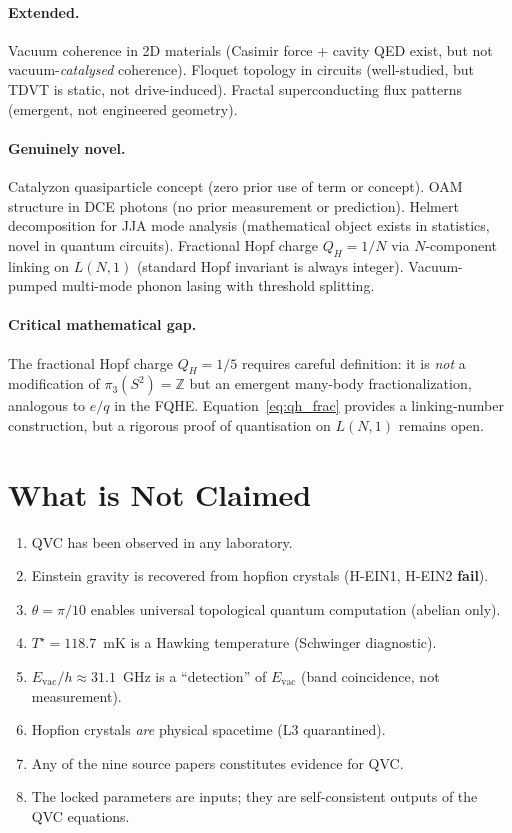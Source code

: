 \documentclass[11pt,letterpaper]{article}
\newcommand{\Evac}{E_{\mathrm{vac}}}
\newcommand{\Qhopf}{Q_H}
\newcommand{\Tstar}{T^{\!\star}}
\begin{document}
\paragraph{Extended.}  Vacuum coherence in 2D materials (Casimir force + cavity QED exist, but not vacuum-\emph{catalysed} coherence).  Floquet topology in circuits (well-studied, but TDVT is static, not drive-induced).  Fractal superconducting flux patterns (emergent, not engineered geometry).

\paragraph{Genuinely novel.}  Catalyzon quasiparticle concept (zero prior use of term or concept).  OAM structure in DCE photons (no prior measurement or prediction).  Helmert decomposition for JJA mode analysis (mathematical object exists in statistics, novel in quantum circuits).  Fractional Hopf charge $\Qhopf = 1/N$ via $N$-component linking on $L(N,1)$ (standard Hopf invariant is always integer).  Vacuum-pumped multi-mode phonon lasing with threshold splitting.

\paragraph{Critical mathematical gap.}  The fractional Hopf charge $\Qhopf = 1/5$ requires careful definition: it is \emph{not} a modification of $\pi_3(S^2) = \mathbb{Z}$ but an emergent many-body fractionalization, analogous to $e/q$ in the FQHE.  Equation~\ref{eq:qh_frac} provides a linking-number construction, but a rigorous proof of quantisation on $L(N,1)$ remains open.


\section{What is Not Claimed}\label{sec:nonclaim}

\begin{nonclaim}
\begin{enumerate}[nosep]
  \item QVC has been observed in any laboratory.
  \item Einstein gravity is recovered from hopfion crystals (H-EIN1, H-EIN2 \textbf{fail}).
  \item $\theta = \pi/10$ enables universal topological quantum computation (abelian only).
  \item $\Tstar = 118.7$~mK is a Hawking temperature (Schwinger diagnostic).
  \item $\Evac/h \approx 31.1$~GHz is a ``detection'' of $\Evac$ (band coincidence, not measurement).
  \item Hopfion crystals \emph{are} physical spacetime (L3 quarantined).
  \item Any of the nine source papers constitutes evidence for QVC.
  \item The locked parameters are inputs; they are self-consistent outputs of the QVC equations.
\end{enumerate}
\end{nonclaim}
\end{document}
